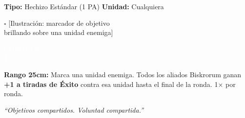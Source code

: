 \begin{center}
\begin{tcbitemize}
\tcbitem[title={\textbf{SEÑAL DE RASTREO} \hfill \textcolor{white}{\small Soporte}}]

    {\fontsize{6.5}{7}\selectfont
    \textbf{Tipo:} Hechizo Estándar (1 PA) \hfill \textbf{Unidad:} Cualquiera}
    \vspace{2pt}

    \begin{tcolorbox}[colback=ChromeGray!15, colframe=ChromeGray!40, height=2.5cm,
                      halign=center, valign=center, sharp corners, size=small, nobeforeafter]
        \textcolor{ChromeGray}{\fontsize{7}{8}\selectfont $\square$ [Ilustración: marcador de objetivo\\ brillando sobre una unidad enemiga]}
    \end{tcolorbox}

    \vfill

    \noindent
    \begin{minipage}[b]{0.22\linewidth}
        \begin{tcolorbox}[colback=BloodPurple, colframe=VoidBlack, sharp corners,
                          halign=center, valign=center, boxsep=0pt,
                          left=0pt, right=0pt, top=0pt, bottom=0pt,
                          nobeforeafter, height=1.9cm]
            \textcolor{white}{\fontsize{5.5}{6}\selectfont COSTO PE\\[3pt] \Large \textbf{1}}
        \end{tcolorbox}
    \end{minipage}%
    \hfill
    \begin{minipage}[b]{0.75\linewidth}
        \begin{tcolorbox}[colback=white, colframe=VoidPurple, sharp corners, boxrule=0.5pt,
                          left=2pt, right=2pt, top=2pt, bottom=2pt,
                          nobeforeafter, height=1.4cm]
            \fontsize{6}{7}\selectfont
            \textbf{Rango 25cm:} Marca una unidad enemiga. Todos los aliados Biskrorum ganan \textbf{+1 a tiradas de Éxito} contra esa unidad hasta el final de la ronda. 1× por ronda.
        \end{tcolorbox}
        \vspace{2pt}
        \begin{center}
            \fontsize{5.5}{6}\selectfont \itshape
            \textcolor{VoidPurple}{``Objetivos compartidos. Voluntad compartida.''}
        \end{center}
    \end{minipage}



\end{tcbitemize}
\end{center}
